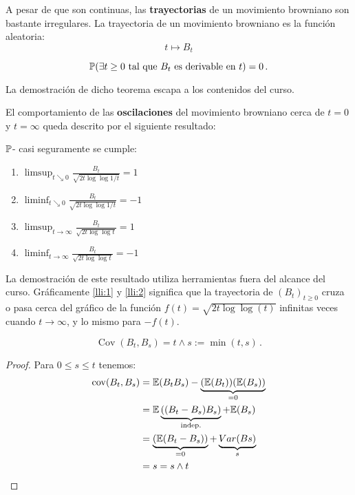 A pesar de que son continuas, las \textbf{trayectorias} de un movimiento browniano son bastante irregulares. La trayectoria de un movimiento browniano es la función aleatoria:
\begin{equation*}
     t \mapsto B_t
\end{equation*}

\begin{theorem}
$$\P( \exists t \geq 0 \text{ tal que } B_t \text{ es derivable en } t) = 0 \,.$$
\end{theorem}

La demostración de dicho teorema escapa a los contenidos del curso. 

\newp El comportamiento de las \textbf{oscilaciones} del movimiento browniano cerca de $t=0$ y $t=\infty$ queda descrito por el siguiente resultado:

\begin{theorem}
$\P$- casi seguramente se cumple:
\begin{enumerate}
     \item \label{lli:1} $\limsup_{t \searrow 0} \frac{B_t}{\sqrt{ 2t \log \log {1/t}}} = 1$
     \item \label{lli:2} $\liminf_{t \searrow 0} \frac{B_t}{\sqrt{ 2t \log \log {1/t}}} = -1$
     \item \label{lli:3} $\limsup_{t \rightarrow \infty} \frac{B_t}{\sqrt{ 2t \log \log {t}}} = 1$
     \item \label{lli:4} $\liminf_{t \rightarrow \infty} \frac{B_t}{\sqrt{ 2t \log \log {t}}} = -1$
\end{enumerate}
\end{theorem}

\newp La demostración de este resultado utiliza herramientas fuera del alcance del curso. Gráficamente  \ref{lli:1} y \ref{lli:2} significa que la trayectoria de $(B_{t})_{t \geq 0}$ cruza o pasa cerca del gráfico de la función $f(t) = \sqrt{2t \log \log (t)} $ infinitas veces cuando $t \rightarrow \infty$, y lo mismo para $-f(t)$. 

\begin{proposition}
     $$\operatorname{Cov}(B_t,B_s) = t \wedge s := \min(t,s)\,.$$ 
\end{proposition}
\begin{proof}
\gris
 Para $0 \leq s \leq t$ tenemos: 
\begin{align*}
     \operatorname{cov}(B_t, B_s)
     &= \E (B_t B_s) - \underbrace{(\E (B_t))(\E (B_s))}_{= 0} \\
     &= \E \underbrace{((B_t - B_s)B_s)}_{\text{indep.}} + \E(B_s) \\
     &= \underbrace{\left( \E(B_t - B_s) \right)}_{=0} + \underbrace{\var({Bs})}_{s}\\
     &= s = s \wedge t
\end{align*}
\findem
\negro
\end{proof}

